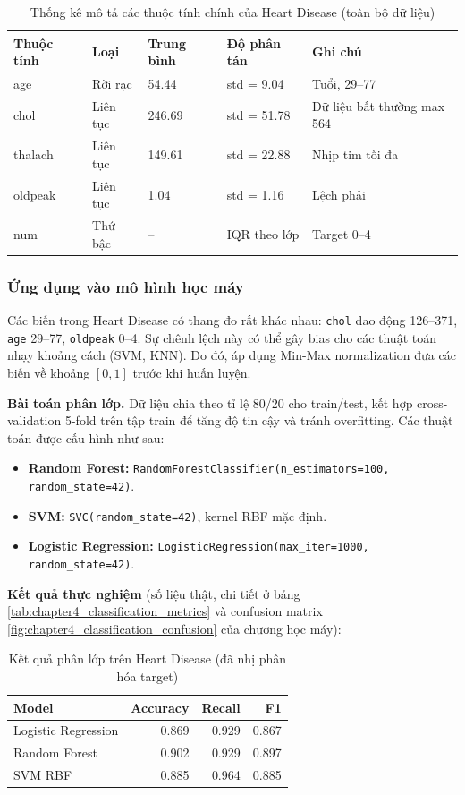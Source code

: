 \begin{table}[H]
\centering
\caption{Thống kê mô tả các thuộc tính chính của Heart Disease (toàn bộ dữ liệu)}
\label{tab:heart_descriptive_stats}
\small
\begin{tabular}{lllll}
\toprule
Thuộc tính & Loại & Trung bình & Độ phân tán & Ghi chú \\
\midrule
age & Rời rạc & 54.44 & std = 9.04 & Tuổi, 29--77 \\
chol & Liên tục & 246.69 & std = 51.78 & Dữ liệu bất thường max 564 \\
thalach & Liên tục & 149.61 & std = 22.88 & Nhịp tim tối đa \\
oldpeak & Liên tục & 1.04 & std = 1.16 & Lệch phải \\
num & Thứ bậc & -- & IQR theo lớp & Target 0--4 \\
\bottomrule
\end{tabular}
\end{table}

\subsubsection{Ứng dụng vào mô hình học máy}

Các biến trong Heart Disease có thang đo rất khác nhau: \texttt{chol} dao động 126--371, \texttt{age} 29--77, \texttt{oldpeak} 0--4. Sự chênh lệch này có thể gây bias cho các thuật toán nhạy khoảng cách (SVM, KNN). Do đó, áp dụng Min-Max normalization đưa các biến về khoảng $[0,1]$ trước khi huấn luyện.

\textbf{Bài toán phân lớp.} Dữ liệu chia theo tỉ lệ 80/20 cho train/test, kết hợp cross-validation 5-fold trên tập train để tăng độ tin cậy và tránh overfitting. Các thuật toán được cấu hình như sau:
\begin{itemize}
 \item \textbf{Random Forest:} \texttt{RandomForestClassifier(n\_estimators=100, random\_state=42)}.
 \item \textbf{SVM:} \texttt{SVC(random\_state=42)}, kernel RBF mặc định.
 \item \textbf{Logistic Regression:} \texttt{LogisticRegression(max\_iter=1000, random\_state=42)}.
\end{itemize}

\textbf{Kết quả thực nghiệm} (số liệu thật, chi tiết ở bảng \ref{tab:chapter4_classification_metrics} và confusion matrix \ref{fig:chapter4_classification_confusion} của chương học máy):

\begin{table}[H]
\centering
\caption{Kết quả phân lớp trên Heart Disease (đã nhị phân hóa target)}
\label{tab:heart_ml_results}
\small
\begin{tabular}{lrrr}
\toprule
Model & Accuracy & Recall & F1 \\
\midrule
Logistic Regression & 0.869 & 0.929 & 0.867 \\
Random Forest & 0.902 & 0.929 & 0.897 \\
SVM RBF & 0.885 & 0.964 & 0.885 \\
\bottomrule
\end{tabular}
\end{table}

